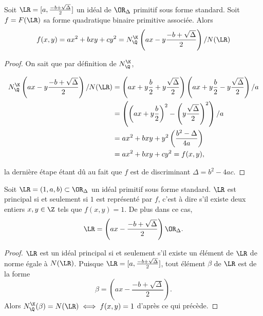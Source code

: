 \begin{Prop}
	
	Soit $\LR = [a , \frac{-b + \sqrt{\Delta}}{2}]$ un idéal de $\OR_{\Delta}$ primitif sous forme standard. Soit $f = F(\LR)$ sa forme quadratique binaire primitive associée. Alors 
	\begin{equation*}
		f(x,y) = ax^2 + bxy + cy^2 = N_{\Q}^{\K}\left( ax - y\frac{-b + \sqrt{\Delta}}{2}\right) / N(\LR)
	\end{equation*}
\end{Prop}

\begin{proof}
	On sait que par définition de $N_{\Q}^{\K}$, 
	
	\begin{align*}
		N_{\Q}^{\K}\left( ax - y\frac{-b + \sqrt{\Delta}}{2}\right) / N(\LR) &= \left( ax + y\frac{b}{2} + y\frac{\sqrt{\Delta}}{2}\right) \left( ax + y\frac{b}{2} - y\frac{\sqrt{\Delta}}{2}\right)/ a\\
		&= \left( \left( ax + y\frac{b}{2} \right)^{2} - \left( y\frac{\sqrt{\Delta}}{2}\right)^{2}\right)/a\\
		&=  ax^2 + bxy + y^2\left( \frac{b^2 - \Delta }{4a}\right) \\
		&= ax^2 + bxy + cy^2 = f(x,y),
	\end{align*}
	
	la dernière étape étant dû au fait que $f$ est de discriminant $\Delta = b^2 - 4ac$.
	
\end{proof}


\begin{Coro}
	Soit $\LR = (1,a,b)\subset\OR_{\Delta}$ un idéal primitif sous forme standard. $\LR$ est principal si et seulement si $1$ est représenté par $f$, c'est à dire s'il existe deux entiers $x, y\in\Z$ tels que $f(x,y) = 1$. De plus dans ce cas,
	\begin{equation*}
		\LR = \left( ax - \frac{-b + \sqrt{\Delta}}{2}\right) \OR_{\Delta}.
	\end{equation*}
\end{Coro}

\begin{proof}
	$\LR$ est un idéal principal si et seulement s'il existe un élément de $\LR$ de norme égale à $N(\LR)$. Puisque $\LR = [a , \frac{-b + \sqrt{\Delta}}{2}]$, tout élément $\beta$ de $\LR$ est de la forme
	\begin{equation*}
		\beta = \left( ax - \frac{-b + \sqrt{\Delta}}{2}\right).
	\end{equation*}
	Alors $N_{\Q}^{\K}(\beta) = N(\LR) \iff f(x,y) = 1$ d'après ce qui précède.
\end{proof}

